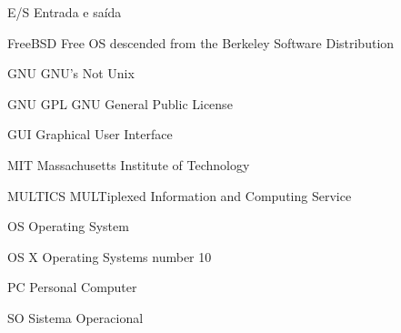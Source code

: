 \begin{siglas}
    \item[E/S] Entrada e saída
    \item[FreeBSD] Free OS descended from the 
    Berkeley Software Distribution 
    \item[GNU] GNU's Not Unix
    \item[GNU GPL] GNU General Public License
    \item[GUI] Graphical User Interface
    \item[MIT] Massachusetts Institute of Technology
    \item[MULTICS] MULTiplexed Information and Computing Service 
    \item[OS] Operating System  
    \item[OS X] Operating Systems number 10 
    \item[PC] Personal Computer
    \item[SO] Sistema Operacional
\end{siglas}